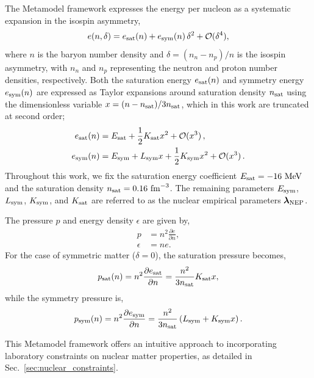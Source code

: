 \documentclass[prd,twocolumn,a4paper,floatfix,nofootinbib,preprintnumbers,superscriptaddress]{revtex4-1}
\begin{document}
The Metamodel framework expresses the energy per nucleon as a systematic expansion in the isospin asymmetry,
\begin{align}
    e(n, \delta) = e_{\rm{sat}}(n) + e_{\rm{sym}}(n)\, \delta^2 + \mathcal{O}(\delta^4), 
    \label{eq:energy_per_nucleon_MM}
\end{align}
where $n$ is the baryon number density and $\delta = (n_n - n_p)/n$ is the isospin asymmetry, with $n_n$ and $n_p$ representing the neutron and proton number densities, respectively. Both the saturation energy $e_{\rm{sat}}(n)$ and symmetry energy $e_{\rm{sym}}(n)$ are expressed as Taylor expansions around saturation density $n_{\rm sat}$ using the dimensionless variable $x = (n - n_{\rm{sat}}) / 3n_{\rm{sat}}$, which in this work are truncated at second order;
\begin{align}
    e_{\rm{sat}}(n) &= E_{\rm{sat}} + \frac{1}{2} K_{\rm{sat}} x^2 + \mathcal{O}(x^3) \, ,
    \label{eq:e_sat} \\
    e_{\rm{sym}}(n) &= E_{\rm{sym}} + L_{\rm{sym}} x + \frac{1}{2} K_{\rm{sym}} x^2 + \mathcal{O}(x^3) \, .
    \label{eq:e_sym}
\end{align}
Throughout this work, we fix the saturation energy coefficient $E_{\rm{sat}} = -16 \ {\rm MeV}$ and the saturation density $n_{\rm{sat}} = 0.16 \ {\rm{fm}}^{-3}$. The remaining parameters $E_{\rm sym}$, $L_{\rm{sym}}$, $K_{\rm{sym}}$, and $K_{\rm sat}$ are referred to as the nuclear empirical parameters $\boldsymbol{\lambda}_{\rm NEP}$.

The pressure $p$ and energy density $\epsilon$ are given by,
\begin{equation}
\begin{aligned}
  p &= n^2\frac{\partial e}{\partial n}, \\
  \epsilon &= ne.
\end{aligned}
\end{equation}
For the case of symmetric matter ($\delta=0$), the saturation pressure becomes,
\begin{equation}
    p_{\rm sat}(n) = n^2\frac{\partial e_{\rm sat}}{\partial n} = \frac{n^2}{3n_{\rm sat}}K_{\rm sat}x,
\end{equation}
while the symmetry pressure is,
\begin{equation}
    p_{\rm sym}(n) = n^2\frac{\partial e_{\rm sym}}{\partial n}= \frac{n^2}{3n_{\rm sat}}\left(L_{\rm sym} + K_{\rm sym}x\right).
\end{equation}

This Metamodel framework offers an intuitive approach to incorporating laboratory constraints on nuclear matter properties, as detailed in Sec.~\ref{sec:nuclear_constraints}.
\end{document}
